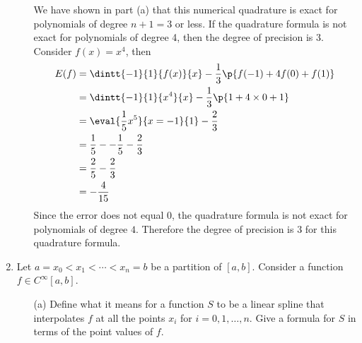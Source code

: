 \documentclass[11pt]{article}
\begin{document}
\begin{enumerate}
\begin{enumerate}
                We have shown in part (a) that this numerical quadrature is
                exact for polynomials of degree $n + 1 = 3$ or less.
                If the quadrature formula is not exact for polynomials
                of degree 4, then the degree of precision is 3.
                Consider $f(x) = x^4$, then
                \begin{align*}
                    E(f) &= \dintt{-1}{1}{f(x)}{x} - \frac{1}{3}\p{f(-1) + 4f(0) + f(1)} \\
                    &= \dintt{-1}{1}{x^4}{x} - \frac{1}{3}\p{1 + 4\times0 + 1} \\
                    &= \eval{\frac{1}{5}x^5}{x = -1}{1} - \frac{2}{3} \\
                    &= \frac{1}{5} - -\frac{1}{5} - \frac{2}{3} \\
                    &= \frac{2}{5} - \frac{2}{3} \\
                    &= -\frac{4}{15}
                \end{align*}
                Since the error does not equal 0, the quadrature formula is
                not exact for polynomials of degree $4$.
                Therefore the degree of precision is $3$ for this quadrature
                formula.
        \end{enumerate}

    \item %
        Let $a = x_0 < x_1 < \cdots < x_n = b$ be a partition of $[a, b]$.
        Consider a function $f \in C^{\infty}[a, b]$.
        \begin{enumerate}
            \item[(a)] %
                Define what it means for a function $S$ to be a linear spline
                that interpolates $f$ at all the points $x_i$ for
                $i = 0, 1, \ldots, n$.
                Give a formula for $S$ in terms of the point values of $f$.


\end{enumerate}
\end{enumerate}
\end{document}
